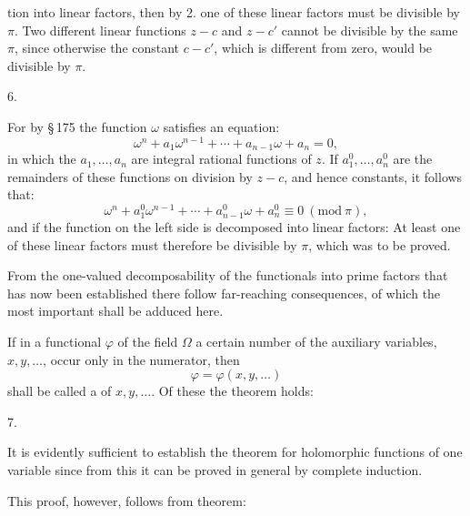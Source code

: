 tion into linear factors, then by 2. one of these linear factors must be divisible by $\pi$. Two different linear functions $z - c$ and $z - c'$ cannot be divisible by the same $\pi$, since otherwise the constant $c - c'$, which is different from zero, would be divisible by $\pi$.

6. 

For by \S\,175 the function $\omega$ satisfies an equation:
\[
\omega^n + a_1 \omega^{n-1} + \cdots + a_{n-1}\omega + a_n = 0,
\]
in which the $a_1, \ldots, a_n$ are integral rational functions of $z$. If $a_1^0, \ldots, a_n^0$ are the remainders of these functions on division by $z - c$, and hence constants, it follows that:
\[
\omega^n + a_1^0 \omega^{n-1} + \cdots + a_{n-1}^0 \omega + a_n^0 \equiv 0\ (\mathrm{mod}\ \pi),
\]
and if the function on the left side is decomposed into linear factors:
At least one of these linear factors must therefore be divisible by $\pi$, which was to be proved.

From the one-valued decomposability of the functionals into prime factors that has now been established there follow far-reaching consequences, of which the most important shall be adduced here.

If in a functional $\varphi$ of the field $\Omega$ a certain number of the auxiliary variables, $x, y, \ldots$, occur only in the numerator, then
\[
\varphi = \varphi(x, y, \ldots)
\]
shall be called a  of $x, y, \ldots$. Of these the theorem holds:

7. 

It is evidently sufficient to establish the theorem for holomorphic functions of one variable
since from this it can be proved in general by complete induction.

This proof, however, follows from  theorem:
